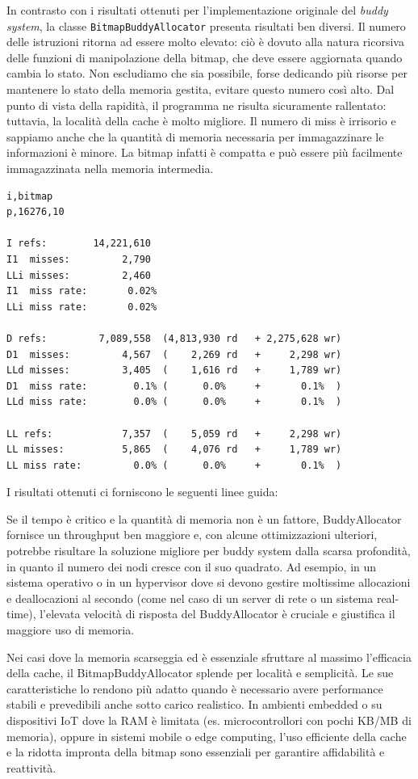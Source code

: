 In contrasto con i risultati ottenuti per l'implementazione originale del \textit{buddy system}, la classe \texttt{BitmapBuddyAllocator} presenta risultati ben diversi. Il numero delle istruzioni ritorna ad essere molto elevato: ciò è dovuto alla natura ricorsiva delle funzioni di manipolazione della bitmap, che deve essere aggiornata quando cambia lo stato. Non escludiamo che sia possibile, forse dedicando più risorse per mantenere lo stato della memoria gestita, evitare questo numero così alto. Dal punto di vista della rapidità, il programma ne risulta sicuramente rallentato: tuttavia, la località della cache è molto migliore. Il numero di miss è irrisorio e sappiamo anche che la quantità di memoria necessaria per immagazzinare le informazioni è minore. La bitmap infatti è compatta e può essere più facilmente immagazzinata nella memoria intermedia. 

\begin{lstlisting}[language={}]
i,bitmap
p,16276,10

I refs:        14,221,610
I1  misses:         2,790
LLi misses:         2,460
I1  miss rate:       0.02%
LLi miss rate:       0.02%

D refs:         7,089,558  (4,813,930 rd   + 2,275,628 wr)
D1  misses:         4,567  (    2,269 rd   +     2,298 wr)
LLd misses:         3,405  (    1,616 rd   +     1,789 wr)
D1  miss rate:        0.1% (      0.0%     +       0.1%  )
LLd miss rate:        0.0% (      0.0%     +       0.1%  )

LL refs:            7,357  (    5,059 rd   +     2,298 wr)
LL misses:          5,865  (    4,076 rd   +     1,789 wr)
LL miss rate:         0.0% (      0.0%     +       0.1%  )
\end{lstlisting}

I risultati ottenuti ci forniscono le seguenti linee guida:

Se il tempo è critico e la quantità di memoria non è un fattore, BuddyAllocator fornisce un throughput ben maggiore e, con alcune ottimizzazioni ulteriori, potrebbe risultare la soluzione migliore per buddy system dalla scarsa profondità, in quanto il numero dei nodi cresce con il suo quadrato. 
Ad esempio, in un sistema operativo o in un hypervisor dove si devono gestire moltissime allocazioni e deallocazioni al secondo (come nel caso di un server di rete o un sistema real-time), l'elevata velocità di risposta del BuddyAllocator è cruciale e giustifica il maggiore uso di memoria.

Nei casi dove la memoria scarseggia ed è essenziale sfruttare al massimo l'efficacia della cache, il BitmapBuddyAllocator splende per località e semplicità. Le sue caratteristiche lo rendono più adatto quando è necessario avere performance stabili e prevedibili anche sotto carico realistico.
In ambienti embedded o su dispositivi IoT dove la RAM è limitata (es. microcontrollori con pochi KB/MB di memoria), oppure in sistemi mobile o edge computing, l'uso efficiente della cache e la ridotta impronta della bitmap sono essenziali per garantire affidabilità e reattività.

